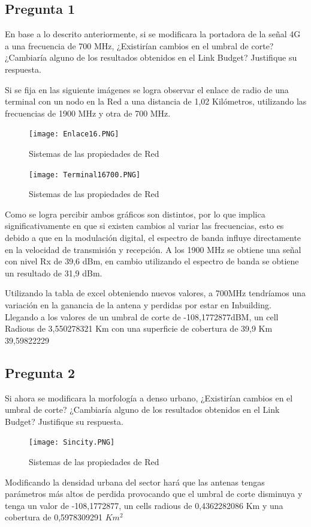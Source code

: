 \documentclass[Article, letterpaper,12pt]{article}
\begin{document}
\subsection{Pregunta 1}
En base a lo descrito anteriormente, si se modificara la portadora de la señal 4G a una frecuencia de 700 MHz, ¿Existirían
cambios en el umbral de corte? ¿Cambiaría alguno de los resultados obtenidos en el Link Budget? Justifique su respuesta.

Si se fija en las siguiente imágenes se logra observar el enlace de radio de una terminal con un nodo en la Red a una distancia de 1,02 Kilómetros, utilizando las frecuencias de 1900 MHz y otra de 700 MHz.

\begin{figure}[H]
    \centering
    \texttt{[image: Enlace16.PNG]}
    \caption{Sistemas de las propiedades de Red}
    \label{fig:my_label}
\end{figure}

\begin{figure}[H]
    \centering
    \texttt{[image: Terminal16700.PNG]}
    \caption{Sistemas de las propiedades de Red}
    \label{fig:my_label}
\end{figure}

Como se logra percibir ambos gráficos son distintos, por lo que implica significativamente en que si existen cambios al variar las frecuencias, esto es debido a que en la modulación digital, el espectro de banda influye directamente en la velocidad de transmisión y recepción. A los 1900 MHz se obtiene una señal con nivel Rx de 39,6 dBm, en cambio utilizando el espectro de banda se obtiene un resultado de 31,9 dBm.

Utilizando la tabla de excel obteniendo nuevos valores, a 700MHz tendríamos una variación en la ganancia de la antena y perdidas por estar en Inbuilding. Llegando a los valores de un umbral de corte de -108,1772877dBM, un cell 
Radious de 3,550278321 Km con una superficie de cobertura de 39,9 Km
39,59822229

\subsection{Pregunta 2}
Si ahora se modificara la morfología a denso urbano, ¿Existirían cambios en el umbral de corte? ¿Cambiaría alguno de los
resultados obtenidos en el Link Budget? Justifique su respuesta.

\begin{figure}[H]
    \centering
    \texttt{[image: Sincity.PNG]}
    \caption{Sistemas de las propiedades de Red}
    \label{fig:my_label}
\end{figure}
Modificando la densidad urbana del sector hará que las antenas tengas parámetros más altos de perdida provocando que el umbral de corte disminuya y tenga un valor de -108,1772877, un cells radious de 0,4362282086 Km y una cobertura de  0,5978309291 $Km^{2}$
\end{document}
